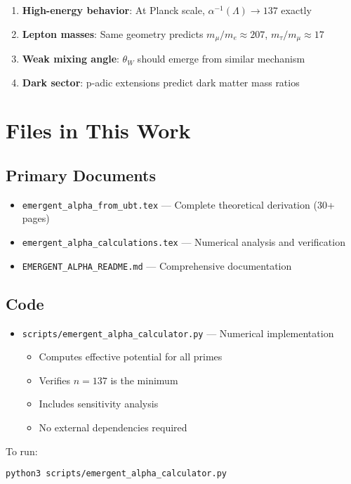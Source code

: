 \documentclass[12pt, a4paper]{article}
\begin{document}
\begin{enumerate}
\item \textbf{High-energy behavior}: At Planck scale, $\alpha^{-1}(\Lambda) \to 137$ exactly
\item \textbf{Lepton masses}: Same geometry predicts $m_\mu/m_e \approx 207$, $m_\tau/m_\mu \approx 17$
\item \textbf{Weak mixing angle}: $\theta_W$ should emerge from similar mechanism
\item \textbf{Dark sector}: p-adic extensions predict dark matter mass ratios
\end{enumerate}

\section{Files in This Work}

\subsection{Primary Documents}

\begin{itemize}
\item \texttt{emergent\_alpha\_from\_ubt.tex} — Complete theoretical derivation (30+ pages)
\item \texttt{emergent\_alpha\_calculations.tex} — Numerical analysis and verification
\item \texttt{EMERGENT\_ALPHA\_README.md} — Comprehensive documentation
\end{itemize}

\subsection{Code}

\begin{itemize}
\item \texttt{scripts/emergent\_alpha\_calculator.py} — Numerical implementation
  \begin{itemize}
  \item Computes effective potential for all primes
  \item Verifies $n = 137$ is the minimum
  \item Includes sensitivity analysis
  \item No external dependencies required
  \end{itemize}
\end{itemize}

To run:
\begin{verbatim}
python3 scripts/emergent_alpha_calculator.py
\end{verbatim}
\end{document}
